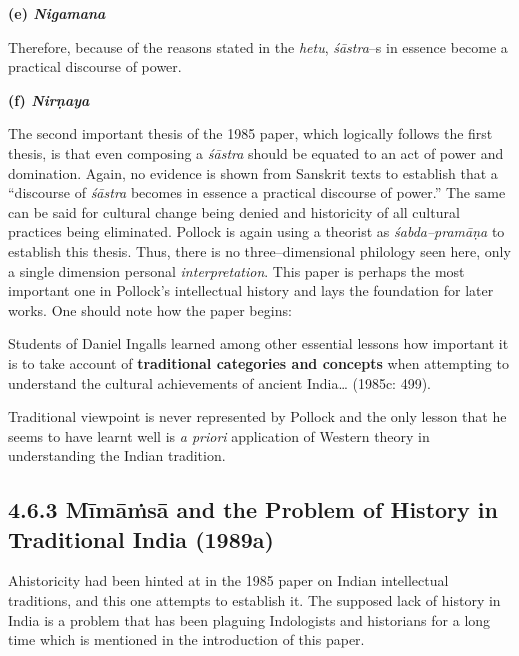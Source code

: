 \textbf{(e) \textit{Nigamana}}

Therefore, because of the reasons stated in the \textit{hetu}, \textit{śāstra}–s in essence become a practical discourse of power.

\textbf{(f) \textit{Nirṇaya}}

The second important thesis of the 1985 paper, which logically follows the first thesis, is that even composing a \textit{śāstra} should be equated to an act of power and domination. Again, no evidence is shown from Sanskrit texts to establish that a “discourse of \textit{śāstra} becomes in essence a practical discourse of power.” The same can be said for cultural change being denied and historicity of all cultural practices being eliminated. Pollock is again using a theorist as \textit{śabda–pramāṇa} to establish this thesis. Thus, there is no three–dimensional philology seen here, only a single dimension personal \textit{interpretation}. This paper is perhaps the most important one in Pollock’s intellectual history and lays the foundation for later works. One should note how the paper begins:

\begin{myquote}
Students of Daniel Ingalls learned among other essential lessons how important it is to take account of \textbf{traditional categories and concepts} when attempting to understand the cultural achievements of ancient India… (1985c: 499).
\end{myquote}

Traditional viewpoint is never represented by Pollock and the only lesson that he seems to have learnt well is \textit{a priori} application of Western theory in understanding the Indian tradition.

\vspace{-.3cm}

\subsection*{4.6.3 Mīmāṁsā and the Problem of History in Traditional India (1989a)}

\vspace{-.3cm}

Ahistoricity had been hinted at in the 1985 paper on Indian intellectual traditions, and this one attempts to establish it. The supposed lack of history in India is a problem that has been plaguing Indologists and historians for a long time which is mentioned in the introduction of this paper.


